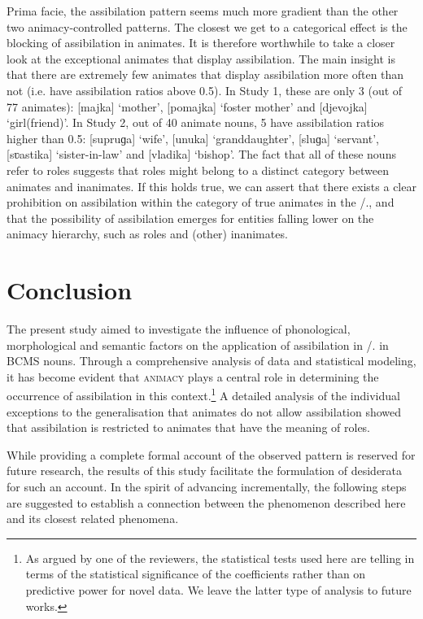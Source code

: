 \documentclass[output=paper,colorlinks,citecolor=brown]{langscibook}
\begin{document}
Prima facie, the assibilation pattern seems much more gradient than the other two animacy-controlled patterns. The closest we get to a categorical effect is the blocking of assibilation in animates. It is therefore worthwhile to take a closer look at the exceptional animates that display assibilation. The main insight is that there are extremely few animates that display assibilation more often than not (i.e. have assibilation ratios above 0.5). In Study 1, these are only 3 (out of 77 animates): [{majka}] `mother’, [{pomajka}] `foster mother’ and [{djevojka}] `girl(friend)’. In Study 2, out of 40 animate nouns, 5 have assibilation ratios higher than 0.5: [{supruɡa}] `wife’, [{unuka}] `granddaughter’, [{sluɡa}] `servant’, [{sʋastika}] `sister-in-law’ and [{vladika}] `bishop’. 
The fact that all of these nouns refer to roles suggests that roles might belong to a distinct category between animates and inanimates. If this holds true, we can assert that there exists a clear prohibition on assibilation within the category of true animates in the {\DAT/\LOC.\SG}, and that the possibility of assibilation emerges for entities falling lower on the animacy hierarchy, such as roles and (other) inanimates.  

\section{Conclusion}
\label{sim:sec:conclusion}

The present study aimed to investigate the influence of phonological, morphological and semantic factors on the application of assibilation in {\DAT/\LOC.\SG} in BCMS nouns. Through a comprehensive analysis of data and statistical modeling, it has become evident that \textsc{animacy} plays a central role in determining the occurrence of assibilation in this context.\footnote{As argued by one of the reviewers, the statistical tests used here are telling in terms of the statistical significance of the coefficients rather than on predictive power for novel data. We leave the latter type of analysis to future works.} A detailed analysis of the individual exceptions to the generalisation that animates do not allow assibilation showed that assibilation is restricted to animates that have the meaning of roles.

While providing a complete formal account of the observed pattern is reserved for future research, the results of this study facilitate the formulation of desiderata for such an account. In the spirit of advancing incrementally, the following steps are suggested to establish a connection between the phenomenon described here and its closest related phenomena.
\end{document}
